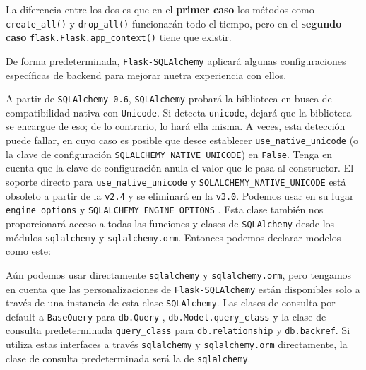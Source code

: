 \documentclass[11pt,letterpaper,notumble]{leaflet}
\begin{document}
{\begin{minipage}{2.2\linewidth}
            La diferencia entre los dos es que en el \textbf{primer caso} los métodos como \texttt{create\_all()} y \texttt{drop\_all()} funcionarán todo el tiempo, pero en el \textbf{segundo caso} \texttt{flask.Flask.app\_context()} tiene que existir.
            
            De forma predeterminada, \texttt{Flask-SQLAlchemy} aplicará algunas configuraciones específicas de backend para mejorar nuetra experiencia con ellos.
            
            A partir de \texttt{SQLAlchemy 0.6}, \texttt{SQLAlchemy} probará la biblioteca en busca de compatibilidad nativa con \texttt{Unicode}. Si detecta \texttt{unicode}, dejará que la biblioteca se encargue de eso; de lo contrario, lo hará ella misma. A veces, esta detección puede fallar, en cuyo caso es posible que desee establecer \texttt{use\_native\_unicode} (o la clave de configuración \texttt{SQLALCHEMY\_NATIVE\_UNICODE}) en \texttt{False}. Tenga en cuenta que la clave de configuración anula el valor que le pasa al constructor. El soporte directo para \texttt{use\_native\_unicode} y \texttt{SQLALCHEMY\_NATIVE\_UNICODE} está obsoleto a partir de la \texttt{v2.4} y se eliminará en la \texttt{v3.0}. Podemos usar en su lugar \texttt{engine\_options} y \texttt{SQLALCHEMY\_ENGINE\_OPTIONS} .
%            
            Esta clase también nos proporcionará acceso a todas las funciones y clases de \texttt{SQLAlchemy} desde los módulos \texttt{sqlalchemy} y \texttt{sqlalchemy.orm}. Entonces podemos declarar modelos como este:
            
            
            
            Aún podemos usar directamente \texttt{sqlalchemy} y \texttt{sqlalchemy.orm}, pero tengamos en cuenta que las personalizaciones de \texttt{Flask-SQLAlchemy} están disponibles solo a través de una instancia de esta clase \texttt{SQLAlchemy}. Las clases de consulta por default a \texttt{BaseQuery} para \texttt{db.Query} , \texttt{db.Model.query\_class} y la clase de consulta predeterminada \texttt{query\_class} para \texttt{db.relationship} y \texttt{db.backref}. Si utiliza estas interfaces a través \texttt{sqlalchemy} y \texttt{sqlalchemy.orm} directamente, la clase de consulta predeterminada será la de \texttt{sqlalchemy}.
        
        \end{minipage}
    
    }
\end{document}
